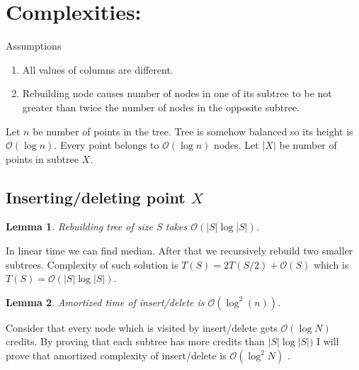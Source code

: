\documentclass[10pt,a4paper]{article}
\newtheorem{lemma}{Lemma}
\newcommand{\Oh}{\mathcal{O}}
\begin{document}
\section{Complexities:}

Assumptions
\begin{enumerate}
\item All values of columns are different.
\item Rebuilding node causes number of nodes in one of its subtree to be not greater than twice the number of nodes in the opposite subtree.
\end{enumerate}

Let $n$ be number of points in the tree. Tree is somehow balanced so its height is $\Oh(\log n)$. Every point belongs to $\Oh(\log n)$ nodes. Let $|X|$ be number of points in subtree $X$.

\subsection{Inserting/deleting point $X$}
\begin{lemma}\label{lem:1}
Rebuilding tree of size S takes $\Oh(|S| \log |S|)$.
\end{lemma}

In linear time we can find median. After that we recursively rebuild two smaller subtrees. Complexity of such solution is $T(S) = 2 T(S/2) + \Oh(S)$ which is $T(S) = \Oh(|S| \log |S|).$

\begin{lemma}\label{lem:2}
Amortized time of insert/delete is $\Oh(\log^2 (n))$.
\end{lemma}

Consider that every node which is visited by insert/delete gets $\Oh(\log N)$ credits. By proving that each subtree has more credits than $|S| \log |S|)$ I will prove that amortized complexity of insert/delete is $\Oh(\log^2{N})$ .
\end{document}
